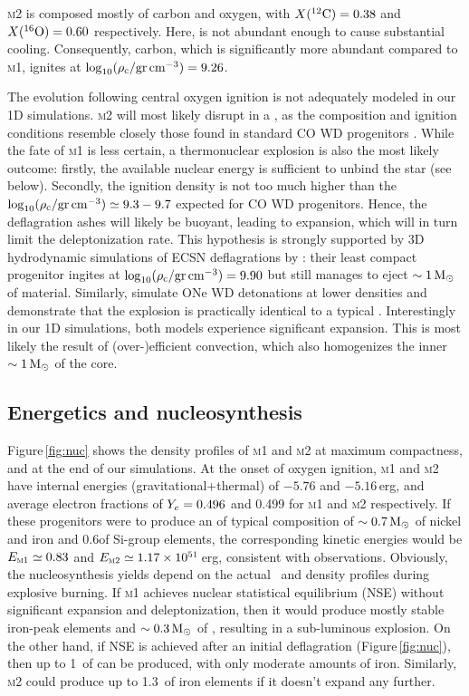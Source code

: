 \documentclass[../../main/thesis_msc.tex]{subfiles}
\begin{document}
\textsc{m2} is composed mostly of carbon and oxygen, with $\abun{C}{12}=0.38$ and $\abun{O}{16}=0.60$ respectively. 
 Here,  is not abundant enough to cause  substantial cooling. Consequently, carbon, which is significantly more abundant compared to \textsc{m1}, ignites at $\logrhoc=9.26$. 
 
The evolution following central oxygen ignition is not adequately modeled in our 1D simulations. 
 \textsc{m2} will most likely disrupt in a \ia, as the composition and
 ignition conditions resemble closely those found in standard CO WD 
 progenitors \citep{Nomoto:1982zz}. While the fate of \textsc{m1} is less 
 certain, a thermonuclear explosion is also the most likely outcome: 
 firstly, the available nuclear energy is sufficient to unbind the star (see 
 below). Secondly, the ignition density is not too much higher than the $\logrhoc\simeq9.3-9.7$ expected for CO WD progenitors. Hence, the 
 deflagration ashes will likely be buoyant, leading to expansion, which will 
 in turn limit the deleptonization rate. This hypothesis is strongly supported
 by 3D hydrodynamic  simulations of ECSN deflagrations by \cite{Jones:2018ule}: their least compact progenitor ingites at $\logrhoc=9.90$ but still manages to eject  $\sim 1\msun$ of material. 
 Similarly,  \cite{marquardt2015} simulate ONe WD detonations at lower 
 densities and demonstrate that the explosion is practically identical to a 
 typical \ia. 
 Interestingly in our 1D simulations, both models experience significant expansion. This is most likely the result of (over-)efficient convection, which also homogenizes the inner $\sim 1\msun$ of the core. 
 
 
 
 

\subsection{Energetics and nucleosynthesis}\label{sec:3}
Figure\,\ref{fig:nuc} shows the density profiles of \textsc{m1} and \textsc{m2} at maximum compactness, and at the end of our simulations. At the onset of oxygen ignition, \textsc{m1} and \textsc{m2} have internal energies (gravitational+thermal) of $-5.76$ and $-5.16$\,erg, and average electron fractions of $\ye= 0.496$ and  0.499 for \textsc{m1} and \textsc{m2} respectively. If these progenitors were to produce an \ia of  typical composition of $\sim 0.7\msun$ of nickel and iron and 0.6\msun of Si-group elements, the corresponding kinetic energies would be $E_{\rm \textsc{m1}}\simeq 0.83$ and $E_{\rm \textsc{m2}}\simeq 1.17\times10^{51}$\,erg, consistent with observations. 
Obviously, the nucleosynthesis yields depend on the actual
\ye\ and density profiles during explosive burning. If 
\textsc{m1} achieves nuclear statistical equilibrium (NSE)
without significant expansion and deleptonization, then it
would produce mostly stable iron-peak elements and $\sim 0.3\msun$ of , resulting in a sub-luminous 
explosion. On the other hand, if NSE is achieved after an 
initial deflagration (Figure\,\ref{fig:nuc}), then up to 
1\msun\ of  can be produced, with only moderate
amounts of iron. Similarly, \textsc{m2} could produce up 
to 1.3\msun\ of iron elements if it doesn't expand any 
further. 
\end{document}
